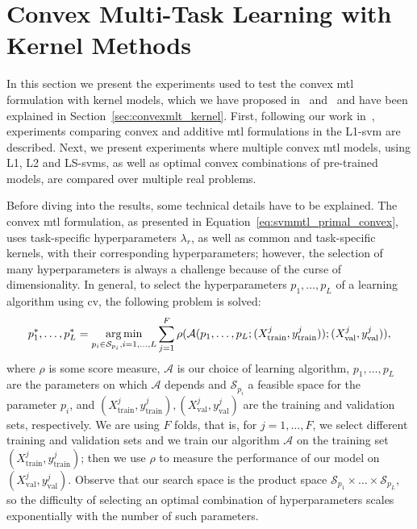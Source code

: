 \section{Convex Multi-Task Learning with Kernel Methods}\label{sec:convexmtlsvm_exp}
In this section we present the experiments used to test the convex \acrshort{mtl} formulation with kernel models, which we have proposed in~\citet{RuizAD19} and~\citet{RuizAD21} and have been explained in Section~\ref{sec:convexmlt_kernel}. 
%
First, following our work in~\citet{RuizAD19}, experiments comparing convex and additive \acrshort{mtl} formulations in the L1-\acrshort{svm} are described. 
%
Next, we present experiments where multiple convex \acrshort{mtl} models, using L1, L2 and LS-\acrshort{svms}, as well as optimal convex combinations of pre-trained models, are compared over multiple real problems.
%

Before diving into the results, some technical details have to be explained. The convex \acrshort{mtl} formulation, as presented in Equation~\eqref{eq:svmmtl_primal_convex}, uses task-specific hyperparameters $\lambda_r$, as well as common and task-specific kernels, with their corresponding hyperparameters; however, the selection of many hyperparameters is always a challenge because of the curse of dimensionality. 
%
In general, to select the hyperparameters $p_1, \ldots, p_L$ of a learning algorithm using \acrshort{cv}, the following problem is solved:
\begin{equation}
    \label{eq:hp-selection_general}
    p_1^*, \ldots, p_L^* = \argmin_{p_i \in \mathcal{S}_{p_i}, i=1, \ldots, L} \sum_{j=1}^{F} \rho(\mathcal{A}(p_1, \ldots, p_L; (X^j_\text{train}, y^j_\text{train})); (X^j_\text{val}, y^j_\text{val})) ,
\end{equation}
where $\rho$ is some score measure, $\mathcal{A}$ is our choice of learning algorithm, $p_1, \ldots, p_L$ are the parameters on which $\mathcal{A}$ depends and $\mathcal{S}_{p_i}$ a feasible space for the parameter $p_i$, and $(X^j_\text{train}, y^j_\text{train}), (X^j_\text{val}, y^j_\text{val})$ are the training and validation sets, respectively. We are using $F$ folds, that is, for $j=1, \ldots, F$, we select different training and validation sets and we train our algorithm $\mathcal{A}$ on the training set $(X^j_\text{train}, y^j_\text{train})$; then we use $\rho$ to measure the performance of our model on $(X^j_\text{val}, y^j_\text{val})$. 
%
Observe that our search space is the product space $\mathcal{S}_{p_1} \times \ldots \times \mathcal{S}_{p_L}$, so the difficulty of selecting an optimal combination of hyperparameters scales exponentially with the number of such parameters.

